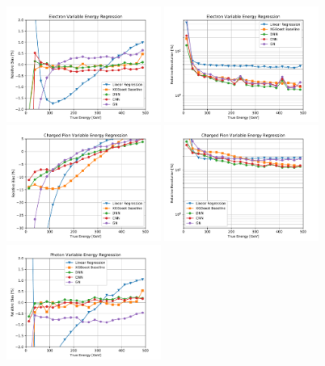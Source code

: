 \begin{figure}[htbp]
\centering
\includegraphics[width=0.45\textwidth]{Images/Calo/bias_vs_E_Ele_variable.pdf}
\includegraphics[width=0.45\textwidth]{Images/Calo/res_vs_E_Ele_variable.pdf} \\
\includegraphics[width=0.45\textwidth]{Images/Calo/bias_vs_E_ChPi_variable.pdf}
\includegraphics[width=0.45\textwidth]{Images/Calo/res_vs_E_ChPi_variable.pdf} \\
\includegraphics[width=0.45\textwidth]{Images/Calo/bias_vs_E_Gamma_variable.pdf}

\end{figure}
